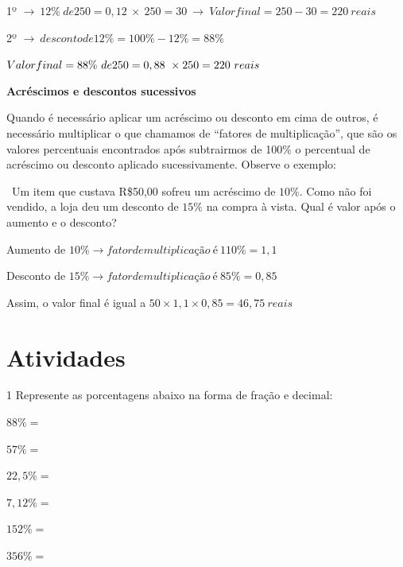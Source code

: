 1º
$\rightarrow \ 12\%\ de 250 = 0,12\  \times \ 250 = 30\  \rightarrow \ Valor final = 250 - 30 = 220\ reais$

2º
$\rightarrow \ desconto de 12\% = 100\% - 12\% = 88\%$

$\\{Valor final} = 88\%\ de 250 = 0,88\  \times 250 = 220\ reais$

\textbf{Acréscimos e descontos sucessivos}

Quando é necessário aplicar um acréscimo ou desconto em cima de outros,
é necessário multiplicar o que chamamos de ``fatores de multiplicação'',
que são os valores percentuais encontrados após subtrairmos de 100\% o
percentual de acréscimo ou desconto aplicado sucessivamente. Observe o
exemplo:

\rightarrow \ Um item que custava R\$50,00 sofreu um acréscimo de
$10\%$. Como não foi vendido, a loja deu um desconto de $15\%$ na compra à
vista. Qual é valor após o aumento e o desconto?

Aumento de $10\%\rightarrow fator de multiplicação\ é\ 110\% = 1,1$

Desconto de $15\% \rightarrow fator de multiplicação\ é\ 85\% = 0,85$

Assim, o valor final é igual a
$50 \times 1,1 \times 0,85 = 46,75\ reais$


\section{Atividades}

\num{1} Represente as porcentagens abaixo na forma de fração e decimal:

\begin{escolha}
\item  $88\% =$  \\
\item  $57\% =$  \\
\item  $22,5\% =$  \\
\item  $7,12\% =$   \\
\item  $152\% =$  \\
\item  $356\% =$  

\end{escolha}

